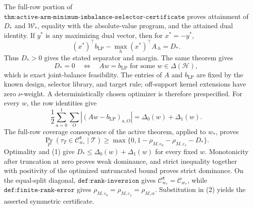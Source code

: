 The full-row portion of \(\texttt{thm:active-arm-minimum-imbalance-selector-certificate}\) proves attainment of \(D_*\) and \(\mathcal W_*\), equality with the absolute-value program, and the attained dual identity. If \(y^*\) is any maximizing dual vector, then for \(x^*=-y^*\), \[(x^*)^\top b_{\mathrm{LP}}-\max_h(x^*)^\top A_{\cdot h}=D_*.\] Thus \(D_*>0\) gives the stated separator and margin. The same theorem gives \[D_*=0\quad\Longleftrightarrow\quad Aw=b_{\mathrm{LP}}\text{ for some }w\in\Delta(\mathcal H),\] which is exact joint-balance feasibility. The entries of \(A\) and \(b_{\mathrm{LP}}\) are fixed by the known design, selector library, and target rule; off-support kernel extensions have zero \(\nu\)-weight. A deterministically chosen optimizer is therefore prespecified.
For every \(w\), the row identities give \[\frac12\sum_{a=0}^1\sum_O|(Aw-b_{\mathrm{LP}})_{a,O}|=\Delta_0(w)+\Delta_1(w).\tag{1}\] The full-row coverage consequence of the active theorem, applied to \(w_*\), proves \[\Pr_P(\tau_T\in\mathcal C^{\boldsymbol\varepsilon}_{w_*}\mid\mathcal T)\ge\max\{0,1-\rho_{M,\varepsilon_0}-\rho_{M,\varepsilon_1}-D_*\}.\tag{2}\] Optimality and (1) give \(D_*\le\Delta_0(w)+\Delta_1(w)\) for every fixed \(w\). Monotonicity after truncation at zero proves weak dominance, and strict inequality together with positivity of the optimized untruncated bound proves strict dominance. On the equal-split diagonal, \(\texttt{def:rank-inversion}\) gives \(\mathcal C^{\boldsymbol\varepsilon}_{w_*}=\mathcal C_{w_*}\), while \(\texttt{def:finite-rank-error}\) gives \(\rho_{M,\varepsilon_0}=\rho_{M,\varepsilon_1}=\rho_{M,\alpha}\). Substitution in (2) yields the asserted symmetric certificate.
